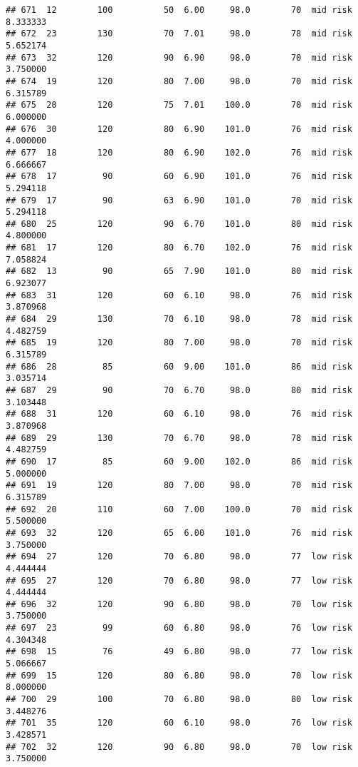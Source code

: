 \documentclass[
  ignorenonframetext,
]{beamer}
\begin{document}
\begin{frame}[fragile]
\begin{verbatim}
## 671  12        100          50  6.00     98.0        70  mid risk      8.333333
## 672  23        130          70  7.01     98.0        78  mid risk      5.652174
## 673  32        120          90  6.90     98.0        70  mid risk      3.750000
## 674  19        120          80  7.00     98.0        70  mid risk      6.315789
## 675  20        120          75  7.01    100.0        70  mid risk      6.000000
## 676  30        120          80  6.90    101.0        76  mid risk      4.000000
## 677  18        120          80  6.90    102.0        76  mid risk      6.666667
## 678  17         90          60  6.90    101.0        76  mid risk      5.294118
## 679  17         90          63  6.90    101.0        70  mid risk      5.294118
## 680  25        120          90  6.70    101.0        80  mid risk      4.800000
## 681  17        120          80  6.70    102.0        76  mid risk      7.058824
## 682  13         90          65  7.90    101.0        80  mid risk      6.923077
## 683  31        120          60  6.10     98.0        76  mid risk      3.870968
## 684  29        130          70  6.10     98.0        78  mid risk      4.482759
## 685  19        120          80  7.00     98.0        70  mid risk      6.315789
## 686  28         85          60  9.00    101.0        86  mid risk      3.035714
## 687  29         90          70  6.70     98.0        80  mid risk      3.103448
## 688  31        120          60  6.10     98.0        76  mid risk      3.870968
## 689  29        130          70  6.70     98.0        78  mid risk      4.482759
## 690  17         85          60  9.00    102.0        86  mid risk      5.000000
## 691  19        120          80  7.00     98.0        70  mid risk      6.315789
## 692  20        110          60  7.00    100.0        70  mid risk      5.500000
## 693  32        120          65  6.00    101.0        76  mid risk      3.750000
## 694  27        120          70  6.80     98.0        77  low risk      4.444444
## 695  27        120          70  6.80     98.0        77  low risk      4.444444
## 696  32        120          90  6.80     98.0        70  low risk      3.750000
## 697  23         99          60  6.80     98.0        76  low risk      4.304348
## 698  15         76          49  6.80     98.0        77  low risk      5.066667
## 699  15        120          80  6.80     98.0        70  low risk      8.000000
## 700  29        100          70  6.80     98.0        80  low risk      3.448276
## 701  35        120          60  6.10     98.0        76  low risk      3.428571
## 702  32        120          90  6.80     98.0        70  low risk      3.750000

\end{verbatim}
\end{frame}
\end{document}

